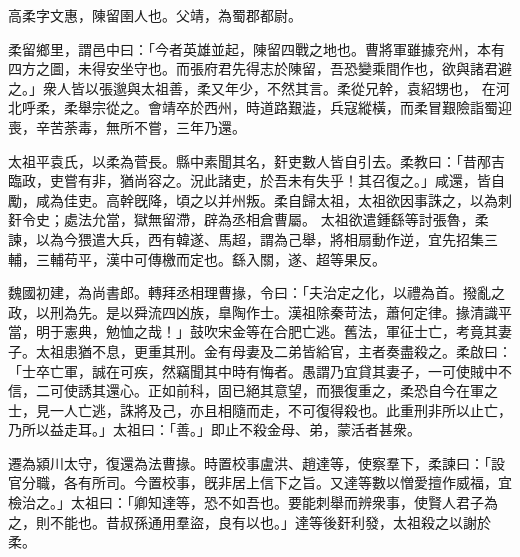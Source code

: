 \begin{pinyinscope}
 
 
 高柔字文惠，陳留圉人也。父靖，為蜀郡都尉。
 
 
 柔留鄉里，謂邑中曰：「今者英雄並起，陳留四戰之地也。曹將軍雖據兖州，本有四方之圖，未得安坐守也。而張府君先得志於陳留，吾恐變乘間作也，欲與諸君避之。」衆人皆以張邈與太祖善，柔又年少，不然其言。柔從兄幹，袁紹甥也，
 在河北呼柔，柔舉宗從之。會靖卒於西州，時道路艱澁，兵寇縱橫，而柔冒艱險詣蜀迎喪，辛苦荼毒，無所不嘗，三年乃還。
 
 
太祖平袁氏，以柔為菅長。縣中素聞其名，姧吏數人皆自引去。柔教曰：「昔邴吉臨政，吏嘗有非，猶尚容之。況此諸吏，於吾未有失乎！其召復之。」咸還，皆自勵，咸為佳吏。高幹旣降，頃之以并州叛。柔自歸太祖，太祖欲因事誅之，以為刺姧令史；處法允當，獄無留滯，辟為丞相倉曹屬。
 太祖欲遣鍾繇等討張魯，柔諫，以為今猥遣大兵，西有韓遂、馬超，謂為己舉，將相扇動作逆，宜先招集三輔，三輔苟平，漢中可傳檄而定也。繇入關，遂、超等果反。
 
 
 
 
 魏國初建，為尚書郎。轉拜丞相理曹掾，令曰：「夫治定之化，以禮為首。撥亂之政，以刑為先。是以舜流四凶族，臯陶作士。漢祖除秦苛法，蕭何定律。掾清識平當，明于憲典，勉恤之哉！」鼓吹宋金等在合肥亡逃。舊法，軍征士亡，考竟其妻子。太祖患猶不息，更重其刑。金有母妻及二弟皆給官，主者奏盡殺之。柔啟曰：「士卒亡軍，誠在可疾，然竊聞其中時有悔者。愚謂乃宜貸其妻子，一可使賊中不信，二可使誘其還心。正如前科，固已絕其意望，而猥復重之，柔恐自今在軍之士，見一人亡逃，誅將及己，亦且相隨而走，不可復得殺也。此重刑非所以止亡，乃所以益走耳。」太祖曰：「善。」即止不殺金母、弟，蒙活者甚衆。
 
 
 
 
 遷為潁川太守，復還為法曹掾。時置校事盧洪、趙達等，使察羣下，柔諫曰：「設官分職，各有所司。今置校事，旣非居上信下之旨。又達等數以憎愛擅作威福，宜檢治之。」太祖曰：「卿知達等，恐不如吾也。要能刺舉而辨衆事，使賢人君子為之，則不能也。昔叔孫通用羣盜，良有以也。」達等後姧利發，太祖殺之以謝於柔。
 

\end{pinyinscope}
